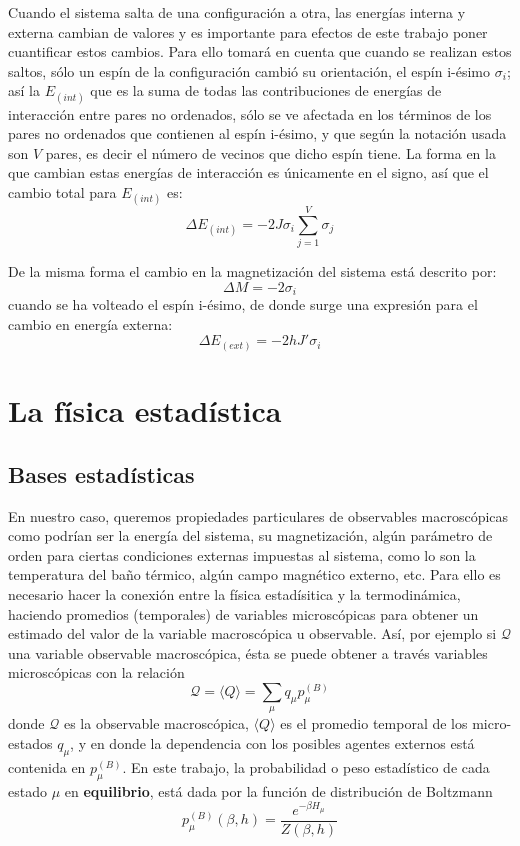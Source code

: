 \documentclass[12pt]{book}
\begin{document}
Cuando el sistema salta de una configuración a otra, las energías interna y externa cambian de valores y es importante para efectos de este trabajo poner cuantificar estos cambios. Para ello tomará en cuenta que cuando se realizan estos saltos, sólo un espín de la configuración cambió su orientación, el espín i-ésimo $\sigma_{i}$; así la $E_{(int)}$ que es la suma de todas las contribuciones de energías de interacción entre pares no ordenados, sólo se ve afectada en los términos de los pares no ordenados que contienen al espín i-ésimo, y que según la notación usada son $V$ pares, es decir el número de vecinos que dicho espín tiene. La forma en la que cambian estas energías de interacción es únicamente en el signo, así que el cambio total para $E_{(int)}$ es:
\begin{equation}
\Delta E_{(int)} = -2J\sigma_{i}\sum_{j=1}^{V} \sigma_{j}
\end{equation}

De la misma forma el cambio en la magnetización del sistema está descrito por:
\begin{equation}
\Delta M = -2\sigma_{i}
\end{equation}
cuando se ha volteado el espín i-ésimo, de donde surge una expresión para el cambio en energía externa:
\begin{equation}
\Delta E_{(ext)} = -2hJ'\sigma_{i}
\end{equation}


\section{La física estadística}
\subsection{Bases estadísticas}
En nuestro caso, queremos propiedades particulares de observables macroscópicas como podrían ser la energía del sistema, su magnetización, algún parámetro de orden para ciertas  condiciones externas impuestas al sistema, como lo son la temperatura del baño térmico, algún campo magnético externo, etc. Para ello es necesario hacer la conexión entre la física estadísitica y la termodinámica, haciendo promedios (temporales) de variables microscópicas para obtener un estimado del valor de la variable macroscópica u observable. Así, por ejemplo si $\mathscr{Q}$ una variable observable macroscópica, ésta se puede obtener a través variables microscópicas con la relación
\begin{equation}
\mathscr{Q} = \langle Q \rangle = \sum_{\mu} q_{\mu}p_{\mu}^{(B)} \label{Observable}
\end{equation}
donde $\mathscr{Q}$ es la observable macroscópica, $\langle Q \rangle$ es el promedio temporal de los micro-estados $q_{\mu}$, y en donde la dependencia con los posibles agentes externos está contenida en $p_{\mu}^{(B)}$. En este trabajo, la probabilidad o peso estadístico de cada estado $\mu$ en \textbf{equilibrio}, está dada por la función de distribución de Boltzmann 
\begin{equation}
p_{\mu}^{(B)}(\beta,h) = \frac{e^{-\beta H_{\mu}}}{Z(\beta,h)} \label{P. Boltzmann}
\end{equation}
\end{document}
